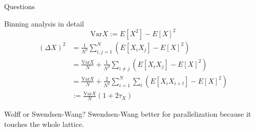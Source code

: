 \documentclass[]{beamer}
\begin{document}
\begin{frame}
\centerline{\huge{Questions}}
\note{ }
\end{frame}

\begin{frame}{Binning analysis in detail}
\[ \text{Var} X := E \left[ X^2 \right] - E \left[ X \right]^2 \]
\begin{align*}
(\Delta X)^2 &= \frac{1}{N^2} \sum\limits_{i,j=1}^N \left( E \left[ X_i X_j \right] - E \left[ X \right]^2 \right) \\
&= \frac{\text{Var}X}{N}+\frac{1}{N^2}\sum\limits_{i\neq j} \left( E \left[X_i X_j \right] - E \left[ X \right]^2 \right) \\
&= \frac{\text{Var}X}{N}+\frac{2}{N^2}\sum\limits_{i=1}^N \sum\limits_t \left( E\left[X_i X_{i+t} \right] - E \left[ X \right]^2 \right) \\
&:= \frac{\text{Var}X}{N}\left(1+2\tau_X\right)
\end{align*}
\end{frame}

\begin{frame}{Wolff or Swendsen-Wang?}
Swendsen-Wang better for parallelization because it touches the whole lattice.
\note{ }
\end{frame}
\end{document}
